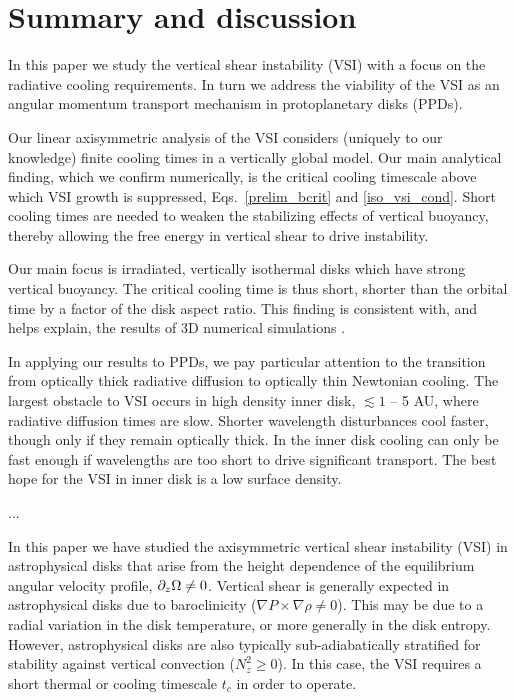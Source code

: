 \section{Summary and discussion}\label{summary}
In this paper we study the vertical shear instability (VSI) with a focus on 
the radiative cooling requirements.  In turn we address the viability of the VSI 
as an angular momentum transport mechanism in protoplanetary disks (PPDs).

Our linear axisymmetric analysis of the VSI 
considers (uniquely to our knowledge) finite cooling times in a vertically global model.  
Our main analytical finding, which we confirm numerically, is the critical cooling 
timescale above which VSI growth is suppressed, Eqs.\ \ref{prelim_bcrit} and \ref{iso_vsi_cond}.
Short cooling times are needed to weaken the stabilizing effects of vertical buoyancy, thereby allowing 
the free energy in vertical shear to drive instability.

Our main focus is irradiated, vertically isothermal disks which have strong vertical buoyancy.
The critical cooling time is thus short, shorter than the orbital time by a factor of the disk
aspect ratio.  This finding is consistent with, and helps explain, the results of 3D numerical simulations .

In applying our results to PPDs, we pay particular attention to the transition from 
optically thick radiative diffusion to optically thin Newtonian cooling.  The largest obstacle to VSI occurs in 
high density inner disk, $\lesssim 1$ -- 5 AU, where radiative diffusion times are slow.  Shorter wavelength disturbances
 cool faster, though only if they remain optically thick.  In the inner disk cooling can only be fast enough
 if wavelengths are too short to drive significant transport.  The best hope for the VSI in inner disk is a low surface density.

...

In this paper we have studied the axisymmetric vertical shear 
instability (VSI) in astrophysical disks that arise from the 
height dependence of the equilibrium angular velocity profile,  
$\partial_z\Omega\neq 0$. Vertical shear is generally
expected in astrophysical disks due to baroclinicity ($\nabla
P\times\nabla \rho \neq 0$). This may be due
to a radial variation in the disk temperature, or more generally in
the disk entropy. However, astrophysical disks are also typically
sub-adiabatically stratified for stability against vertical
convection ($N_z^2\geq 0$). In this case, the VSI requires a short
thermal or cooling timescale $t_c$ in order to operate.  

